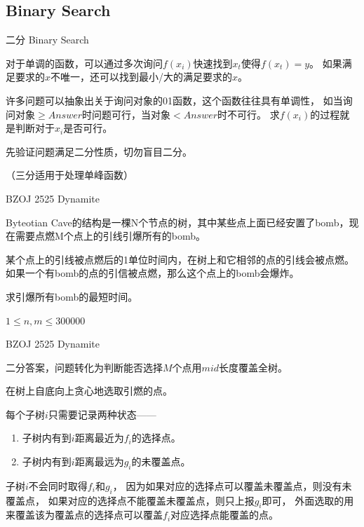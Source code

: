 \documentclass{beamer}
\begin{document}
\subsection{Binary Search}

\begin{frame}{二分 Binary Search}

    对于单调的函数，可以通过多次询问$f(x_i)$快速找到$x_t$使得$f(x_t)=y$。
    如果满足要求的$x$不唯一，还可以找到最小/大的满足要求的$x$。

    许多问题可以抽象出关于询问对象的01函数，这个函数往往具有单调性，
    如当询问对象$\geq Answer$时问题可行，当对象$< Answer$时不可行。
    求$f(x_i)$的过程就是判断对于$x_i$是否可行。

    先验证问题满足二分性质，切勿盲目二分。

    （三分适用于处理单峰函数）
    
\end{frame}

\begin{frame}{BZOJ 2525 Dynamite}

    Byteotian Cave的结构是一棵N个节点的树，其中某些点上面已经安置了bomb，现在需要点燃M个点上的引线引爆所有的bomb。
 
    某个点上的引线被点燃后的1单位时间内，在树上和它相邻的点的引线会被点燃。如果一个有bomb的点的引信被点燃，那么这个点上的bomb会爆炸。

    求引爆所有bomb的最短时间。

    $1\leq n,m \leq 300000$

\end{frame}

\begin{frame}{BZOJ 2525 Dynamite}

    二分答案，问题转化为判断能否选择$M$个点用$mid$长度覆盖全树。

    在树上自底向上贪心地选取引燃的点。

    每个子树$i$只需要记录两种状态——

    \begin{enumerate}
        \item 子树内有到$i$距离最近为$f_i$的选择点。
        \item 子树内有到$i$距离最远为$g_i$的未覆盖点。
    \end{enumerate}

    子树$i$不会同时取得$f_i$和$g_i$，
    因为如果对应的选择点可以覆盖未覆盖点，则没有未覆盖点，
    如果对应的选择点不能覆盖未覆盖点，则只上报$g_i$即可，
    外面选取的用来覆盖该为覆盖点的选择点可以覆盖$f_i$对应选择点能覆盖的点。

\end{frame}
\end{document}

